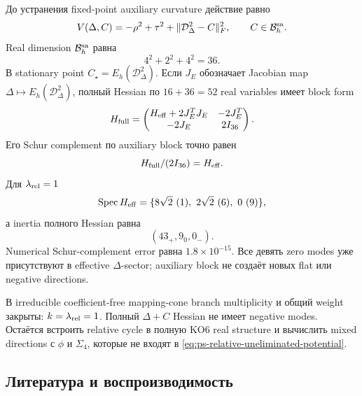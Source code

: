 До устранения fixed-point auxiliary curvature действие равно
\begin{equation}
 V(\Delta,C)=-\rho^2+\tau^2
 +\|\mathcal D_\Delta^2-C\|_F^2,
 \qquad
 C\in\mathcal B_h^{\rm sa}.
 \label{eq:ps-relative-uneliminated-potential}
\end{equation}
Real dimension \(\mathcal B_h^{\rm sa}\) равна
\begin{equation}
 4^2+2^2+4^2=36.
\end{equation}
В stationary point
\(C_\star=E_h(\mathcal D_\Delta^2)\). Если \(J_E\) обозначает Jacobian
map \(\Delta\mapsto E_h(\mathcal D_\Delta^2)\), полный Hessian по
\(16+36=52\) real variables имеет block form
\begin{equation}
 H_{\rm full}=
 \begin{pmatrix}
 H_{\rm eff}+2J_E^TJ_E&-2J_E^T\\
 -2J_E&2I_{36}
 \end{pmatrix}.
 \label{eq:ps-relative-full-hessian-block}
\end{equation}
Его Schur complement по auxiliary block точно равен
\begin{equation}
 H_{\rm full}/(2I_{36})=H_{\rm eff}.
\end{equation}
Для \(\lambda_{\rm rel}=1\)
\begin{equation}
 \operatorname{Spec} H_{\rm eff}
 =\{8\sqrt2\ (1),\ 2\sqrt2\ (6),\ 0\ (9)\},
\end{equation}
а inertia полного Hessian равна
\begin{equation}
 \boxed{(43_+,9_0,0_-).}
 \label{eq:ps-relative-full-hessian-inertia}
\end{equation}
Numerical Schur-complement error равна
\(1.8\times10^{-15}\). Все девять zero modes уже присутствуют в effective
\(\Delta\)-sector; auxiliary block не создаёт новых flat или negative
directions.

\begin{theorem}
В irreducible coefficient-free mapping-cone branch multiplicity и общий
weight закрыты: \(k=\lambda_{\rm rel}=1\). Полный
\(\Delta+C\) Hessian не имеет negative modes. Остаётся встроить relative
cycle в полную KO6 real structure и вычислить mixed directions с
\(\phi\) и \(\Sigma_4\), которые не входят в
\eqref{eq:ps-relative-uneliminated-potential}.
\end{theorem}

\subsection{Литература и воспроизводимость}

